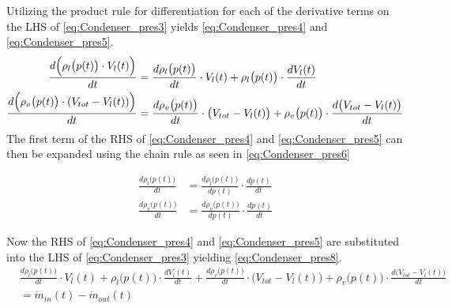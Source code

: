Utilizing the product rule for differentiation for each of the derivative terms on the LHS of \cref{eq:Condenser_pres3} yields \cref{eq:Condenser_pres4} and \cref{eq:Condenser_pres5}.
\begin{align}
	\frac{d \Bigl(\rho_{l}\bigl(p(t)\bigr)\cdot V_l(t)\Bigr)}{dt}  				& =   \frac{d \rho_{l}\bigl(p(t)\bigr)}{dt} \cdot V_l(t)   +   \rho_{l}\bigl(p(t)\bigr)\cdot\frac{d V_l(t)}{dt} 	\label{eq:Condenser_pres4} \\
	\frac{d \Bigl(\rho_{v}\bigl(p(t)\bigr)\cdot (V_{tot} - V_l(t))\Bigr) }{dt} 	& =  \frac{d \rho_{v}\bigl(p(t)\bigr)}{dt} \cdot \bigl(V_{tot} - V_l(t)\bigr)   +   \rho_{v}\bigl(p(t)\bigr)\cdot\frac{d \bigl(V_{tot} - V_l(t)\bigr)}{dt} 	\label{eq:Condenser_pres5}
\end{align}
The first term of the RHS of \cref{eq:Condenser_pres4} and \cref{eq:Condenser_pres5} can then be expanded using the chain rule as seen in \cref{eq:Condenser_pres6}

\begin{align}
	\frac{d \rho_{l}\bigl(p(t)\bigr)}{dt} 				& =   \frac{d \rho_{l}\bigl(p(t)\bigr)}{dp(t)} \cdot \frac{dp(t)}{dt}	\label{eq:Condenser_pres6} \\
		\frac{d \rho_{v}\bigl(p(t)\bigr)}{dt} 			& =   \frac{d \rho_{v}\bigl(p(t)\bigr)}{dp(t)} \cdot \frac{dp(t)}{dt}	\label{eq:Condenser_pres7}
\end{align}

Now the RHS of \cref{eq:Condenser_pres4} and \cref{eq:Condenser_pres5} are substituted into the LHS of \cref{eq:Condenser_pres3} yielding \cref{eq:Condenser_pres8}. \\


\begin{equation}\label{eq:Condenser_pres8}
	\begin{split}
		& \frac{d \rho_{l}\bigl(p(t)\bigr)}{dt} \cdot V_l(t)   +   \rho_{l}\bigl(p(t)\bigr)\cdot\frac{d V_l(t)}{dt} +
		\frac{d \rho_{v}\bigl(p(t)\bigr)}{dt} \cdot \bigl(V_{tot} - V_l(t)\bigr)   +   \rho_{v}\bigl(p(t)\bigr)\cdot\frac{d \bigl(V_{tot} - V_l(t)\bigr)}{dt} \\
		& = \dot{m}_{in}(t) - \dot{m}_{out}(t)
	\end{split}
\end{equation}


